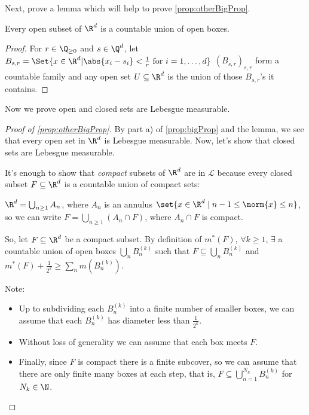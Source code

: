\documentclass{article}
\newcommand{\1}[1]{\mathbbm{1}_{#1}}
\begin{document}
Next, prove a lemma which will help to prove \cref{prop:otherBigProp}.

\begin{lemma}
    Every open subset of $\R^d$ is a countable union of open boxes.
\end{lemma}

\begin{proof}
    For $r \in \Q_{\geq 0}$ and $s \in \Q^d$, let $B_{s, r} = \Set{x \in \R^d | \abs{x_i - s_i} < \frac1r \ \text{for} \ i=1,\dotsc,d}$
    $(B_{s,r})_{s,r}$ form a countable family and any open set $U \subseteq \R^d$ is the union of those $B_{s,r}$'s it contains.
\end{proof}

Now we prove open and closed sets are Lebesgue measurable.
\begin{proof}[Proof of \cref{prop:otherBigProp}] %
    By part a) of \cref{prop:bigProp} and the lemma, we see that every open set in $\R^d$ is Lebesgue measurable. Now, let's show that closed sets are Lebesgue measurable.

    It's enough to show that \emph{compact} subsets of $\R^d$ are in $\mathcal{L}$ because every closed subset $F \subseteq \R^d$ is a countable union of compact sets:

    $\R^d = \bigcup_{n \geq 1} A_n$, where $A_n$ is an annulus $\set{x \in \R^d \mid n-1 \leq \norm{x} \leq n}$, so we can write $F = \bigcup_{n \geq 1} (A_n \cap F)$, where $A_n \cap F$ is compact.

    So, let $F \subseteq \R^d$ be a compact subset. By definition of $m^*(F)$, $\forall k \geq 1$, $\exists $ a countable union of open boxes $\bigcup_n B_n^{(k)}$ such that $F \subseteq \bigcup_n B_n^{(k)}$ and $m^*(F) + \frac{1}{2^k} \geq \sum_n m(B_n^{(k)})$.

    Note:
    \begin{itemize}
        \item Up to subdividing each $B_n^{(k)}$ into a finite number of smaller boxes, we can assume that each $B_n^{(k)}$ has diameter less than $\frac{1}{2^k}$.
        \item Without loss of generality we can assume that each box meets $F$.
        \item Finally, since $F$ is compact there is a finite subcover, so we can assume that there are only finite many boxes at each step, that is, $F \subseteq \bigcup_{n=1}^{N_k} B_n^{(k)}$ for $N_k \in \N$.
    \end{itemize}


\end{proof}
\end{document}
